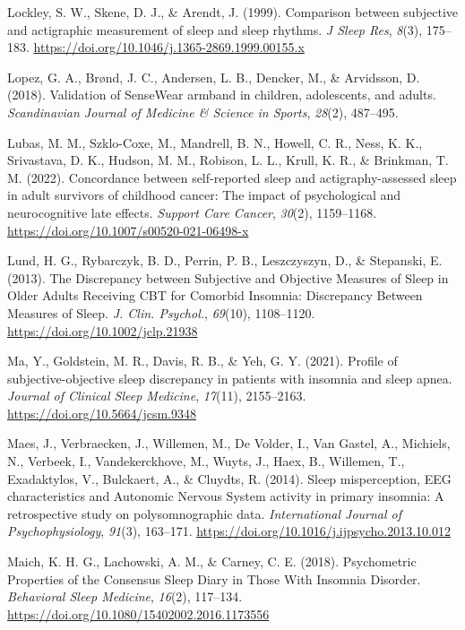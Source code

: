 \documentclass[
]{article}
\newlength{\cslhangindent}
\newenvironment{CSLReferences}[2] %
 {\begin{list}{}{%
  \setlength{\itemindent}{0pt}
  \setlength{\leftmargin}{0pt}
  \setlength{\parsep}{0pt}
  \ifodd #1
   \setlength{\leftmargin}{\cslhangindent}
   \setlength{\itemindent}{-1\cslhangindent}
  \fi
  \setlength{\itemsep}{#2\baselineskip}}}
 {\end{list}}
\begin{document}
\begin{CSLReferences}{1}{0}
Lockley, S. W., Skene, D. J., \& Arendt, J. (1999). Comparison between subjective and actigraphic measurement of sleep and sleep rhythms. \emph{J Sleep Res}, \emph{8}(3), 175--183. \url{https://doi.org/10.1046/j.1365-2869.1999.00155.x}

Lopez, G. A., Brønd, J. C., Andersen, L. B., Dencker, M., \& Arvidsson, D. (2018). Validation of SenseWear armband in children, adolescents, and adults. \emph{Scandinavian Journal of Medicine \& Science in Sports}, \emph{28}(2), 487--495.

Lubas, M. M., Szklo-Coxe, M., Mandrell, B. N., Howell, C. R., Ness, K. K., Srivastava, D. K., Hudson, M. M., Robison, L. L., Krull, K. R., \& Brinkman, T. M. (2022). Concordance between self-reported sleep and actigraphy-assessed sleep in adult survivors of childhood cancer: The impact of psychological and neurocognitive late effects. \emph{Support Care Cancer}, \emph{30}(2), 1159--1168. \url{https://doi.org/10.1007/s00520-021-06498-x}

Lund, H. G., Rybarczyk, B. D., Perrin, P. B., Leszczyszyn, D., \& Stepanski, E. (2013). The {Discrepancy} between {Subjective} and {Objective} {Measures} of {Sleep} in {Older} {Adults} {Receiving} {CBT} for {Comorbid} {Insomnia}: {Discrepancy} {Between} {Measures} of {Sleep}. \emph{J. Clin. Psychol.}, \emph{69}(10), 1108--1120. \url{https://doi.org/10.1002/jclp.21938}

Ma, Y., Goldstein, M. R., Davis, R. B., \& Yeh, G. Y. (2021). Profile of subjective-objective sleep discrepancy in patients with insomnia and sleep apnea. \emph{Journal of Clinical Sleep Medicine}, \emph{17}(11), 2155--2163. \url{https://doi.org/10.5664/jcsm.9348}

Maes, J., Verbraecken, J., Willemen, M., De Volder, I., Van Gastel, A., Michiels, N., Verbeek, I., Vandekerckhove, M., Wuyts, J., Haex, B., Willemen, T., Exadaktylos, V., Bulckaert, A., \& Cluydts, R. (2014). Sleep misperception, {EEG} characteristics and {Autonomic} {Nervous} {System} activity in primary insomnia: {A} retrospective study on polysomnographic data. \emph{International Journal of Psychophysiology}, \emph{91}(3), 163--171. \url{https://doi.org/10.1016/j.ijpsycho.2013.10.012}

Maich, K. H. G., Lachowski, A. M., \& Carney, C. E. (2018). Psychometric {Properties} of the {Consensus} {Sleep} {Diary} in {Those} {With} {Insomnia} {Disorder}. \emph{Behavioral Sleep Medicine}, \emph{16}(2), 117--134. \url{https://doi.org/10.1080/15402002.2016.1173556}


\end{CSLReferences}
\end{document}
